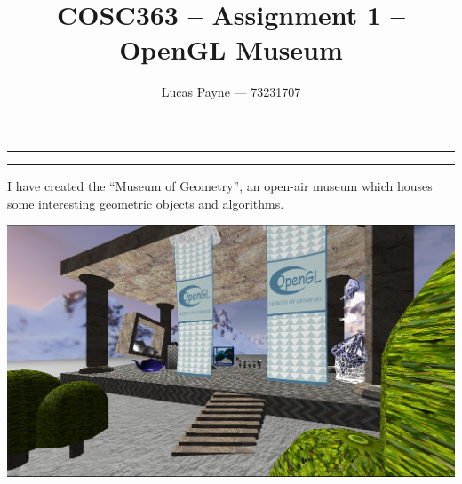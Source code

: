\documentclass{article}
\begin{document}
\title{COSC363 -- Assignment 1 -- OpenGL Museum}
\author{Lucas Payne --- 73231707}
\date{}
\maketitle
\vskip -0.2in
\hrule
\vskip 0.03in
\hrule
\vskip 0.2in

\newcommand{\thing}[3]{
\vskip 0.2in
\hrule
\vskip 0.03in
\hrule
\vskip 0.1in
    \textbf{\textit{#3 #1}}:
#2
\vskip 0.1in
\hrule
\vskip 0.03in
\hrule
\vskip 0.2in
}
\newcommand{\exhibit}[2]{\thing{#1}{#2}{Exhibit}}
\newcommand{\feature}[2]{\thing{#1}{#2}{Feature}}
\newcommand{\leadin}[2]{
    \textit{#1}
    \vskip 0.1in
    \hrule
    \vskip 0.08in
    #2
    \vskip 0.6cm
}

I have created the ``Museum of Geometry'', an open-air museum which houses some interesting geometric objects and algorithms.
\begin{center}\includegraphics[width=\linewidth]{screenshots/museum_from_outside.png}\end{center}
\end{document}

